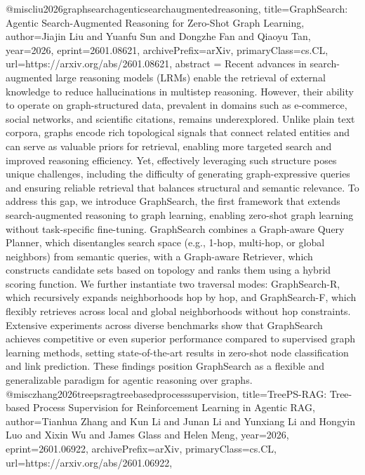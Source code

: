 {}@misc{liu2026graphsearchagenticsearchaugmentedreasoning,
      title={GraphSearch: Agentic Search-Augmented Reasoning for Zero-Shot Graph Learning}, 
      author={Jiajin Liu and Yuanfu Sun and Dongzhe Fan and Qiaoyu Tan},
      year={2026},
      eprint={2601.08621},
      archivePrefix={arXiv},
      primaryClass={cs.CL},
      url={https://arxiv.org/abs/2601.08621},
      abstract = {Recent advances in search-augmented large reasoning models (LRMs) enable the retrieval of external knowledge to reduce hallucinations in multistep reasoning. However, their ability to operate on graph-structured data, prevalent in domains such as e-commerce, social networks, and scientific citations, remains underexplored. Unlike plain text corpora, graphs encode rich topological signals that connect related entities and can serve as valuable priors for retrieval, enabling more targeted search and improved reasoning efficiency. Yet, effectively leveraging such structure poses unique challenges, including the difficulty of generating graph-expressive queries and ensuring reliable retrieval that balances structural and semantic relevance. To address this gap, we introduce GraphSearch, the first framework that extends search-augmented reasoning to graph learning, enabling zero-shot graph learning without task-specific fine-tuning. GraphSearch combines a Graph-aware Query Planner, which disentangles search space (e.g., 1-hop, multi-hop, or global neighbors) from semantic queries, with a Graph-aware Retriever, which constructs candidate sets based on topology and ranks them using a hybrid scoring function. We further instantiate two traversal modes: GraphSearch-R, which recursively expands neighborhoods hop by hop, and GraphSearch-F, which flexibly retrieves across local and global neighborhoods without hop constraints. Extensive experiments across diverse benchmarks show that GraphSearch achieves competitive or even superior performance compared to supervised graph learning methods, setting state-of-the-art results in zero-shot node classification and link prediction. These findings position GraphSearch as a flexible and generalizable paradigm for agentic reasoning over graphs.}
}@misc{zhang2026treepsragtreebasedprocesssupervision,
      title={TreePS-RAG: Tree-based Process Supervision for Reinforcement Learning in Agentic RAG}, 
      author={Tianhua Zhang and Kun Li and Junan Li and Yunxiang Li and Hongyin Luo and Xixin Wu and James Glass and Helen Meng},
      year={2026},
      eprint={2601.06922},
      archivePrefix={arXiv},
      primaryClass={cs.CL},
      url={https://arxiv.org/abs/2601.06922},
}

